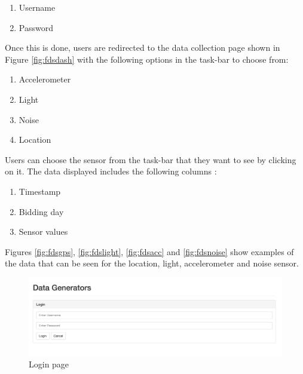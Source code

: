 \begin{enumerate}
    \item Username
    \item Password
\end{enumerate}

Once this is done, users are redirected to the data collection page shown in Figure \ref{fig:fdsdash} with the following options in the task-bar  to choose from:

\begin{enumerate}
    \item Accelerometer
    \item Light
    \item Noise
    \item Location
\end{enumerate}

Users can choose the sensor from the task-bar that they want to see by clicking on it. The data displayed includes the following columns :

\begin{enumerate}
    \item Timestamp
    \item Bidding day
    \item Sensor values
\end{enumerate}

Figures \ref{fig:fdsgps}, \ref{fig:fdslight}, \ref{fig:fdsacc} and \ref{fig:fdsnoise} show examples of the data that can be seen for the location,
light, accelerometer and noise sensor.



  


\begin{figure}[ht!]
\centering
\includegraphics[width=\textwidth,keepaspectratio]{./images/fds_user_login1}
\caption{Login page\label{fig:fdslogin}}
\end{figure}

